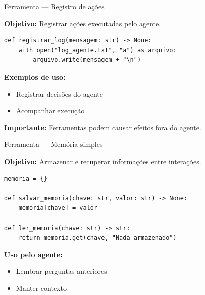 \documentclass{beamer}
\begin{document}
\begin{frame}[fragile]{Ferramenta — Registro de ações}
    
    \textbf{Objetivo:}  
    Registrar ações executadas pelo agente.
    
    \begin{verbatim}
def registrar_log(mensagem: str) -> None:
    with open("log_agente.txt", "a") as arquivo:
        arquivo.write(mensagem + "\n")
    \end{verbatim}
    
    \vspace{0.3cm}
    
    \textbf{Exemplos de uso:}
    \begin{itemize}
        \item Registrar decisões do agente
        \item Acompanhar execução
    \end{itemize}
    
    \vspace{0.3cm}
    
    \textbf{Importante:}  
    Ferramentas podem causar efeitos fora do agente.
    
\end{frame}

\begin{frame}[fragile]{Ferramenta — Memória simples}
    
    \textbf{Objetivo:}  
    Armazenar e recuperar informações entre interações.
    
    \begin{verbatim}
memoria = {}

def salvar_memoria(chave: str, valor: str) -> None:
    memoria[chave] = valor

def ler_memoria(chave: str) -> str:
    return memoria.get(chave, "Nada armazenado")
    \end{verbatim}
    
    \vspace{0.3cm}
    
    \textbf{Uso pelo agente:}
    \begin{itemize}
        \item Lembrar perguntas anteriores
        \item Manter contexto
    \end{itemize}
    
\end{frame}
\end{document}
